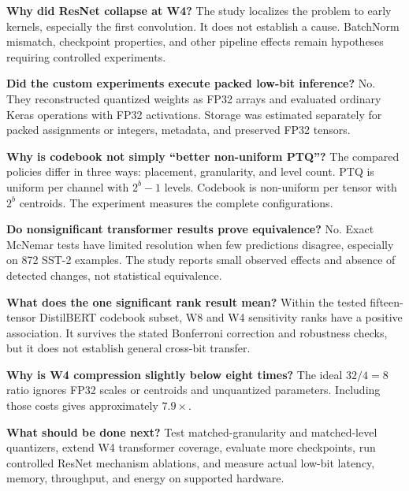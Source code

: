 \documentclass[11pt,a4paper]{article}
\begin{document}
\textbf{Why did ResNet collapse at W4?} The study localizes the problem to early kernels, especially the first convolution. It does not establish a cause. BatchNorm mismatch, checkpoint properties, and other pipeline effects remain hypotheses requiring controlled experiments.

\textbf{Did the custom experiments execute packed low-bit inference?} No. They reconstructed quantized weights as FP32 arrays and evaluated ordinary Keras operations with FP32 activations. Storage was estimated separately for packed assignments or integers, metadata, and preserved FP32 tensors.

\textbf{Why is codebook not simply ``better non-uniform PTQ''?} The compared policies differ in three ways: placement, granularity, and level count. PTQ is uniform per channel with $2^b-1$ levels. Codebook is non-uniform per tensor with $2^b$ centroids. The experiment measures the complete configurations.

\textbf{Do nonsignificant transformer results prove equivalence?} No. Exact McNemar tests have limited resolution when few predictions disagree, especially on 872 SST-2 examples. The study reports small observed effects and absence of detected changes, not statistical equivalence.

\textbf{What does the one significant rank result mean?} Within the tested fifteen-tensor DistilBERT codebook subset, W8 and W4 sensitivity ranks have a positive association. It survives the stated Bonferroni correction and robustness checks, but it does not establish general cross-bit transfer.

\textbf{Why is W4 compression slightly below eight times?} The ideal $32/4=8$ ratio ignores FP32 scales or centroids and unquantized parameters. Including those costs gives approximately $7.9\times$.

\textbf{What should be done next?} Test matched-granularity and matched-level quantizers, extend W4 transformer coverage, evaluate more checkpoints, run controlled ResNet mechanism ablations, and measure actual low-bit latency, memory, throughput, and energy on supported hardware.
\end{document}
